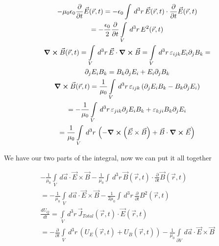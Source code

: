 \documentclass[fleqn]{report}
\newcommand{\del}{\partial}
\newcommand{\equations} [1] {
\begin{gather*}
#1
\end{gather*}
}
\begin{document}
\equations{ 
    -\mu_0 \epsilon_0 
    \frac{\del}{\del t}
    \vec E(\vec r, t)
    =
    - \epsilon_0 
    \int \, d^3 r \, 
    \vec E(\vec r, t)
    \cdot 
    \frac{\del}{\del t}
    \vec E(\vec r, t)
    \\
    =
    - \frac{\epsilon_0}{2} 
    \frac{\del}{\del t}
    \int\limits_{V} \, d^3 r \, 
    E^2(\vec r, t)
    \\
    \curl \vec B(\vec r, t)
    =
    \int\limits_{V} \, d^3 r \, 
    \vec E 
    \cdot 
    \curl \vec B 
    =
    \int\limits_{V} \, d^3 r \, 
    \varepsilon_{ijk}
    E_{i}
    \del_{j}
    B_{k}
    =
    \\
    \del_{j}
    E_{i}
    B_{k}
    =
    B_{k} 
    \del_{j}
    E_{i}
    +
    E_{i}
    \del_{j}
    B_{k} 
    \\
    \curl \vec B(\vec r, t)
    = 
    \frac{1}{\mu_0}
    \int\limits_{V} \, d^3 r \, 
    \varepsilon_{ijk}
    \left(
        \del_{j}
        E_{i}
        B_{k} 
        -
        B_{k} 
        \del_{j}
        E_{i}
    \right)
    \\
    = 
    -
    \frac{1}{\mu_0}
    \int\limits_{V} \, d^3 r \, 
    \varepsilon_{jik}
    \del_{j}
    E_{i}
    B_{k} 
    +
    \varepsilon_{kji}
    B_{k} 
    \del_{j}
    E_{i}
    \\
    =
    \frac{1}{\mu_0}
    \int\limits_{V} \, d^3 r \, 
    \left( 
    - \curl 
    (\vec E \times \vec B)
    +
    \vec B
    \cdot 
    \curl \vec E 
    \right)
}

We have our two parts of the integral, now we can put it all together 
\equations{
    - 
    \frac{1}{\mu_0}
    \int\limits_{V} \, d \vec a \cdot 
    \vec E 
    \times 
    \vec B 
    -
    \frac{1}{\mu_0}
    \int \, d^3 r \, 
    \vec B(\vec r, t)
    \cdot 
    \frac{\del}{\del t}
    \vec B(\vec r, t)
    \\
    =
    - 
    \frac{1}{\mu_0}
    \int\limits_{V} \, d \vec a \cdot 
    \vec E 
    \times 
    \vec B 
    -
    \frac{1}{2\mu_0}
    \int \, d^3 r \, 
    \frac{\del}{\del t}
    B^2(\vec r, t)
    \\
    \frac{dU_{Q}}{dt}
    =
    \int\limits_{V} \, d^3 r \, 
    \vec J_{Total}(\vec r, t)
    \cdot 
    \vec E(\vec r, t) 
    \\
    =
    - 
    \frac{\del}{\del t}
    \int\limits_{V} \, d^3 r \, 
    \left(
        U_{E}(\vec r, t)
        +
        U_{B}(\vec r, t)
    \right)
    -
    \frac{1}{\mu_0}
    \int\limits_{\del V} \, d \vec a \cdot 
    \vec E \times \vec B 
}
\end{document}

